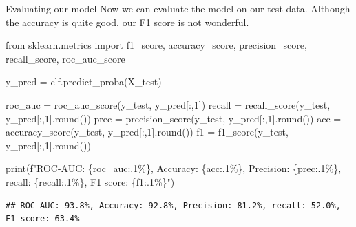 \documentclass[
  10pt,
  ignorenonframetext,
  aspectratio=169]{beamer}
\newenvironment{Shaded}{\begin{snugshade}}{\end{snugshade}}
\newcommand{\BuiltInTok}[1]{\textcolor[rgb]{0.80,0.80,0.80}{#1}}
\newcommand{\DecValTok}[1]{\textcolor[rgb]{0.86,0.86,0.80}{#1}}
\newcommand{\ImportTok}[1]{\textcolor[rgb]{0.80,0.80,0.80}{#1}}
\newcommand{\NormalTok}[1]{\textcolor[rgb]{0.80,0.80,0.80}{#1}}
\newcommand{\OperatorTok}[1]{\textcolor[rgb]{0.94,0.94,0.82}{#1}}
\newcommand{\SpecialCharTok}[1]{\textcolor[rgb]{0.86,0.64,0.64}{#1}}
\newcommand{\SpecialStringTok}[1]{\textcolor[rgb]{0.80,0.58,0.58}{#1}}
\begin{document}
\begin{frame}[fragile]{Evaluating our model}
\protect\hypertarget{evaluating-our-model}{}
Now we can evaluate the model on our test data. Although the accuracy is
quite good, our F1 score is not wonderful.

\medskip
\scriptsize

\begin{Shaded}
\begin{Highlighting}[]
\ImportTok{from}\NormalTok{ sklearn.metrics }\ImportTok{import}\NormalTok{ f1\_score, accuracy\_score, precision\_score, recall\_score, roc\_auc\_score}

\NormalTok{y\_pred }\OperatorTok{=}\NormalTok{ clf.predict\_proba(X\_test)}

\NormalTok{roc\_auc }\OperatorTok{=}\NormalTok{ roc\_auc\_score(y\_test, y\_pred[:,}\DecValTok{1}\NormalTok{])}
\NormalTok{recall }\OperatorTok{=}\NormalTok{ recall\_score(y\_test, y\_pred[:,}\DecValTok{1}\NormalTok{].}\BuiltInTok{round}\NormalTok{())}
\NormalTok{prec }\OperatorTok{=}\NormalTok{ precision\_score(y\_test, y\_pred[:,}\DecValTok{1}\NormalTok{].}\BuiltInTok{round}\NormalTok{())}
\NormalTok{acc }\OperatorTok{=}\NormalTok{ accuracy\_score(y\_test, y\_pred[:,}\DecValTok{1}\NormalTok{].}\BuiltInTok{round}\NormalTok{())}
\NormalTok{f1 }\OperatorTok{=}\NormalTok{ f1\_score(y\_test, y\_pred[:,}\DecValTok{1}\NormalTok{].}\BuiltInTok{round}\NormalTok{())}

\BuiltInTok{print}\NormalTok{(}\SpecialStringTok{f"ROC{-}AUC: }\SpecialCharTok{\{}\NormalTok{roc\_auc}\SpecialCharTok{:.1\%\}}\SpecialStringTok{, Accuracy: }\SpecialCharTok{\{}\NormalTok{acc}\SpecialCharTok{:.1\%\}}\SpecialStringTok{, Precision: }\SpecialCharTok{\{}\NormalTok{prec}\SpecialCharTok{:.1\%\}}\SpecialStringTok{, recall: }\SpecialCharTok{\{}\NormalTok{recall}\SpecialCharTok{:.1\%\}}\SpecialStringTok{, F1 score: }\SpecialCharTok{\{}\NormalTok{f1}\SpecialCharTok{:.1\%\}}\SpecialStringTok{"}\NormalTok{)}
\end{Highlighting}
\end{Shaded}

\begin{verbatim}
## ROC-AUC: 93.8%, Accuracy: 92.8%, Precision: 81.2%, recall: 52.0%, F1 score: 63.4%
\end{verbatim}
\end{frame}
\end{document}
